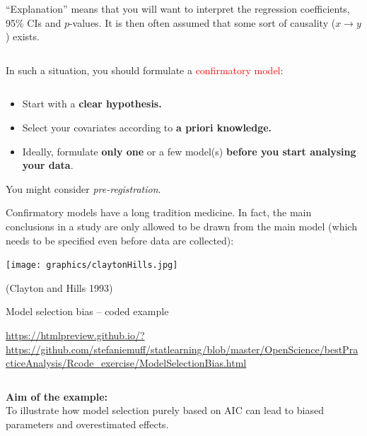 \documentclass[
  10pt,
  ignorenonframetext,
]{beamer}
\begin{document}
\begin{frame}
\(~\)

``Explanation'' means that you will want to interpret the regression
coefficients, 95\% CIs and \(p\)-values. It is then often assumed that
some sort of causality (\(x\rightarrow y\)) exists.

\(~\)

In such a situation, you should formulate a
\textcolor{red}{confirmatory model}:

\(~\)

\begin{tcolorbox}
\begin{itemize}
\item Start with a {\bf clear hypothesis.}

\vspace{2mm}

\item Select your covariates according to {\bf a priori knowledge.}

\vspace{2mm}

\item Ideally, formulate {\bf only one} or a few model(s) {\bf before you start analysing your data}.
\end{itemize}

\end{tcolorbox}

\vspace{8mm}

You might consider \emph{pre-registration}.
\end{frame}

\begin{frame}
Confirmatory models have a long tradition medicine. In fact, the main
conclusions in a study are only allowed to be drawn from the main model
(which needs to be specified even before data are collected):

\vspace{2mm}

\texttt{[image: graphics/claytonHills.jpg]}
\(~\)

\scriptsize (Clayton and Hills 1993)
\end{frame}

\begin{frame}
\begin{block}{Model selection bias -- coded example}
\protect\hypertarget{model-selection-bias-coded-example}{}
\(~\)

\url{https://htmlpreview.github.io/?https://github.com/stefaniemuff/statlearning/blob/master/OpenScience/bestPracticeAnalysis/Rcode_exercise/ModelSelectionBias.html}

\(~\)

\begin{tcolorbox}
{\bf Aim of the example:} \\
To illustrate how model selection purely based on AIC can lead to biased parameters and overestimated effects.

\end{tcolorbox}
\end{block}
\end{frame}
\end{document}
